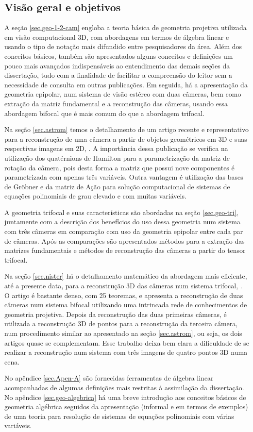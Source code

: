 \subsection*{Visão geral e objetivos}

A seção \ref{sec.geo-1-2-cam} engloba a teoria básica de geometria projetiva utilizada em visão computacional 3D, com abordagens em termos de álgebra linear e usando o tipo de notação mais difundido entre pesquisadores da área. Além dos conceitos básicos, também são apresentados alguns conceitos e definições um pouco mais avançados indispensáveis ao entendimento das demais seções da dissertação, tudo com a finalidade de facilitar a compreensão do leitor sem a necessidade de consulta em outras publicações. Em seguida, há a apresentação da geometria epipolar, num sistema de visão estéreo com duas câmeras, bem como extração da matriz fundamental e a reconstrução das câmeras, usando essa abordagem bifocal que é mais comum do que a abordagem trifocal.

Na seção \ref{sec.astrom} temos o detalhamento de um artigo recente e representativo para a reconstrução de uma câmera a partir de objetos geométricos em 3D e suas respectivas imagens em 2D, \citep{bib:kuang}. A importância dessa publicação se verifica na utilização dos quatérnions de Hamilton para a parametrização da matriz de rotação da câmera, pois desta forma a matriz que possui nove componentes é parametrizada com apenas três variáveis. Outra vantagem é utilização das bases de Gr\"obner e da matriz de Ação para solução computacional de sistemas de equações polinomiais de grau elevado e com muitas variáveis.

A geometria trifocal e suas características são abordadas na seção \ref{sec.geo-tri}, juntamente com a descrição dos benefícios do uso dessa geometria num sistema com três câmeras em comparação com uso da geometria epipolar entre cada par de câmeras. Após as comparações são apresentados métodos para a extração das matrizes fundamentais e métodos de reconstrução das câmeras a partir do tensor trifocal.  

Na seção \ref{sec.nister} há o detalhamento matemático da abordagem mais eficiente, até a presente data, para a reconstrução 3D das câmeras num sistema trifocal, \citep{2503343}. O artigo é bastante denso, com 25 teoremas, e apresenta a reconstrução de duas câmeras num sistema bifocal utilizando uma intrincada rede de conhecimentos de geometria projetiva. Depois da reconstrução das duas primeiras câmeras, é utilizada a reconstrução 3D de pontos para a reconstrução da terceira câmera, num procedimento similar ao apresentado na seção \ref{sec.astrom}, ou seja, os dois artigos quase se complementam. Esse trabalho deixa bem clara a dificuldade de se realizar a reconstrução num sistema com três imagens de quatro pontos 3D numa cena.

No apêndice \ref{sec.Apen-A} são fornecidas ferramentas de álgebra linear acompanhadas de algumas definições mais restritas à assimilação da dissertação. No apêndice \ref{sec.geo-algebrica} há uma breve introdução aos conceitos básicos de geometria algébrica seguidos da apresentação (informal e em termos de exemplos) de uma teoria para resolução de sistemas de equações polinomiais com várias variáveis.

